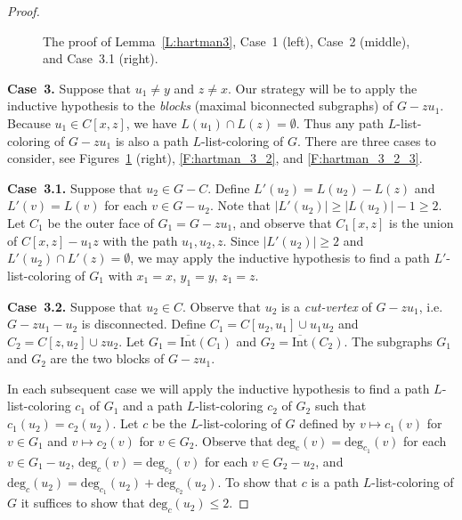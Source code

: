 \documentclass[12pt,letterpaper]{article}
\newcommand{\graphintc}{\overline{\text{Int}}}
\theoremstyle{plain}
\theoremstyle{definition}
\theoremstyle{break}
\newcommand{\defterm}[1]{\emph{#1}} %
\begin{document}
\begin{proof}
\begin{figure}
\begin{center}
    \caption{The proof of Lemma~\ref{L:hartman3}, Case~1 (left), Case~2
    (middle), and Case~3.1 (right).}
    \label{F:hartman_1}
\end{center}
\end{figure}

\textbf{Case~3.}
Suppose that $u_1\ne y$ and $z\ne x$. 
Our strategy will be to apply the inductive hypothesis to
the \defterm{blocks} (maximal biconnected subgraphs) of $G-zu_1$.
Because $u_1\in C[x,z]$, we have $L(u_1)\cap L(z)=\emptyset$.
Thus any path $L$-list-coloring of $G-zu_1$ is also a path $L$-list-coloring
of $G$. There are three cases to consider, see
Figures~\ref{F:hartman_1} (right), \ref{F:hartman_3_2},
and \ref{F:hartman_3_2_3}.

\textbf{Case~3.1.}
Suppose that $u_2\in G-C$. Define $L'(u_2)=L(u_2)- L(z)$ and
$L'(v)=L(v)$ for each $v\in G-u_2$. Note that $|L'(u_2)|\ge |L(u_2)|-1\ge 2$.
Let $C_1$ be the outer face of $G_1=G-zu_1$,
and observe that $C_1[x,z]$ is the union of $C[x,z]-u_1z$ with the
path $u_1,u_2,z$. Since $|L'(u_2)|\ge 2$ and $L'(u_2)\cap
L'(z)=\emptyset$, we may apply the inductive hypothesis
to find a path $L'$-list-coloring of $G_1$ with $x_1=x$, $y_1=y$, $z_1=z$.

\textbf{Case~3.2.}
Suppose that $u_2\in C$. Observe that $u_2$ is a \defterm{cut-vertex} of
$G-zu_1$, i.e. $G-zu_1-u_2$ is disconnected.
Define $C_1=C[u_2,u_1]\cup u_1u_2$ and
$C_2=C[z,u_2]\cup zu_2$. Let $G_1=\graphintc(C_1)$ and $G_2=\graphintc(C_2)$.
The subgraphs $G_1$ and $G_2$ are the two blocks of
$G-zu_1$.

In each subsequent case we will apply the inductive
hypothesis to find a path $L$-list-coloring $c_1$ of $G_1$ and a path
$L$-list-coloring $c_2$ of $G_2$ such that $c_1(u_2)=c_2(u_2)$. Let
$c$ be the $L$-list-coloring of $G$ defined by $v\mapsto c_1(v)$ for $v\in G_1$
and $v\mapsto c_2(v)$ for $v\in G_2$.
Observe that $\text{deg}_c(v)=\text{deg}_{c_1}(v)$
for each $v\in G_1-u_2$, $\text{deg}_c(v)=\text{deg}_{c_2}(v)$ for each
$v\in G_2-u_2$, and
$\text{deg}_c(u_2)=\text{deg}_{c_1}(u_2)+\text{deg}_{c_2}(u_2)$.
To show that $c$ is a path $L$-list-coloring of $G$ it suffices to show that
$\text{deg}_{c}(u_2)\le 2$.


\end{proof}
\end{document}

